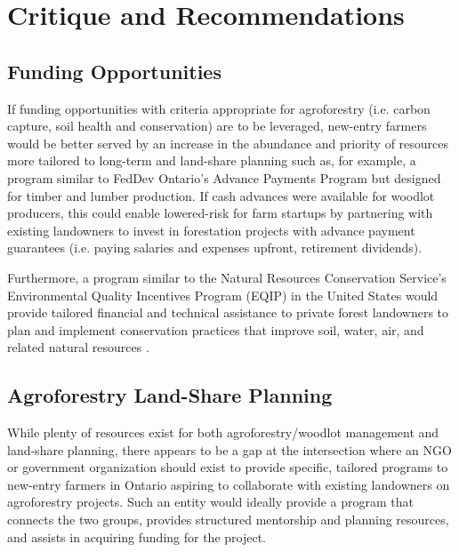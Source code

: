 \documentclass{report}
\begin{document}

\section{Critique and Recommendations}

\subsection{Funding Opportunities}

\hspace{24pt}If funding opportunities with criteria appropriate for agroforestry (i.e. carbon capture, soil health and conservation) are to be leveraged, new-entry farmers would be better served by an increase in the abundance and priority of resources more tailored to long-term and land-share planning such as, for example, a program similar to FedDev Ontario's Advance Payments Program but designed for timber and lumber production. If cash advances were available for woodlot producers, this could enable lowered-risk for farm startups by partnering with existing landowners to invest in forestation projects with advance payment guarantees (i.e. paying salaries and expenses upfront, retirement dividends).

\hspace{24pt}Furthermore, a program similar to the Natural Resources Conservation Service's Environmental Quality Incentives Program (EQIP) in the United States would provide tailored financial and technical assistance to private forest landowners to plan and implement conservation practices that improve soil, water, air, and related natural resources \parencite{eqip}. 

\subsection{Agroforestry Land-Share Planning}

\hspace{24pt}While plenty of resources exist for both agroforestry/woodlot management and land-share planning, there appears to be a gap at the intersection where an NGO or government organization should exist to provide specific, tailored programs to new-entry farmers in Ontario aspiring to collaborate with existing landowners on agroforestry projects. Such an entity would ideally provide a program that connects the two groups, provides structured mentorship and planning resources, and assists in acquiring funding for the project.
\end{document}
